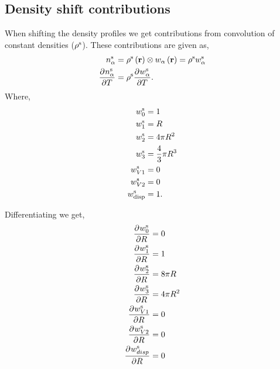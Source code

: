 \documentclass[12pt, letterpaper]{article}
\newcommand*{\pd}[3][]{\frac{\partial^{#1}#2}{\partial{#3}^{#1}}}%
\newcommand*{\lb}{\ensuremath{\left(}}
\newcommand*{\rb}{\ensuremath{\right)}}
\newcommand{\disp}{\ensuremath{\text{disp}}\xspace}
\begin{document}
\subsection{Density shift contributions}

When shifting the density profiles we get contributions from convolution of constant densities ($\rho^{\rm{s}}$). These contributions are given as,
\begin{align}
  \label{eq:n_alpha_diff_steady}
  n_\alpha^{\rm{s}} &= \rho^{\rm{s}} \lb \mathbf{r} \rb \otimes w_\alpha \lb \mathbf{r}\rb = \rho^{\rm{s}} w_\alpha^{\rm{s}} \\
  \pd{n_\alpha^{\rm{s}}}{T} &= \rho^{\rm{s}} \pd{w_\alpha^{\rm{s}}}{T}.
\end{align}
Where,
\begin{align}
  \label{eq:weight_functions_steady}
  w_0^{\rm{s}} &= 1  \\
  w_1^{\rm{s}} &= R  \\
  w_2^{\rm{s}} &= 4 \pi R^2  \\
  w_3^{\rm{s}} &= \frac{4}{3} \pi R^3  \\
  w_{V1}^{\rm{s}} &= 0  \\
  w_{V2}^{\rm{s}} &= 0  \\
  w_{\disp}^{\rm{s}} &= 1.
\end{align}

Differentiating we get,
\begin{align}
  \label{eq:weight_functions_steady_diff}
  \pd{w_0^{\rm{s}}}{R} &= 0  \\
  \pd{w_1^{\rm{s}}}{R} &= 1  \\
  \pd{w_2^{\rm{s}}}{R} &= 8 \pi R  \\
  \pd{w_3^{\rm{s}}}{R} &= 4 \pi R^2  \\
  \pd{w_{V1}^{\rm{s}}}{R} &= 0  \\
  \pd{w_{V2}^{\rm{s}}}{R} &= 0  \\
  \pd{w_{disp}^{\rm{s}}}{R} &= 0
\end{align}
\end{document}
